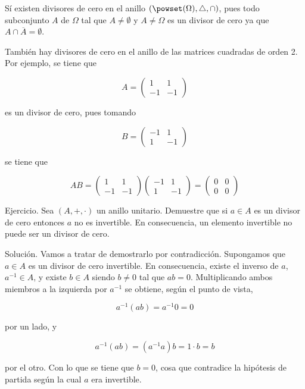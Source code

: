 Sí existen divisores de cero en el anillo $(\powset(\Omega), \triangle,
\cap)$, pues todo subconjunto $A$ de $\Omega$ tal que $A \neq \emptyset$ y
$A \neq \Omega$ es un divisor de cero ya que $A \cap \overline{A} =
\emptyset$.

También hay divisores de cero en el anillo de las matrices cuadradas de
orden 2. Por ejemplo, se tiene que

$$
  A =
  \begin{pmatrix}
    1 & 1 \\
    {-1} & -1
  \end{pmatrix}
$$

\noindent es un divisor de cero, pues tomando

$$
  B =
  \begin{pmatrix}
    {-1} & 1 \\
    1 & -1
  \end{pmatrix}
$$

\noindent se tiene que

$$
  AB =
  \begin{pmatrix}
    1 & 1 \\
    {-1} & {-1}
  \end{pmatrix}
  \begin{pmatrix}
    {-1} & 1 \\
    1 & {-1}
  \end{pmatrix}
  =
  \begin{pmatrix}
    0 & 0 \\
    0 & 0
  \end{pmatrix}
$$

Ejercicio. Sea $(A, +, \cdot)$ un anillo unitario. Demuestre que si $a \in
A$ es un divisor de cero entonces $a$ no es invertible. En consecuencia, un
elemento invertible no puede ser un divisor de cero.

Solución. Vamos a tratar de demostrarlo por contradicción. Supongamos que $a
\in A$ es un divisor de cero invertible. En consecuencia, existe el inverso
de $a$, $a^{-1} \in A$, y existe $b \in A$ siendo $b \neq 0$ tal que $ab =
0$. Multiplicando ambos miembros a la izquierda por $a^{-1}$ se obtiene,
según el punto de vista,

$$ a^{-1}(ab) = a^{-1}0 = 0 $$

\noindent por un lado, y

$$ a^{-1}(ab) = (a^{-1}a)b = 1 \cdot b = b $$

\noindent por el otro. Con lo que se tiene que $b = 0$, cosa que contradice
la hipótesis de partida según la cual $a$ era invertible.

